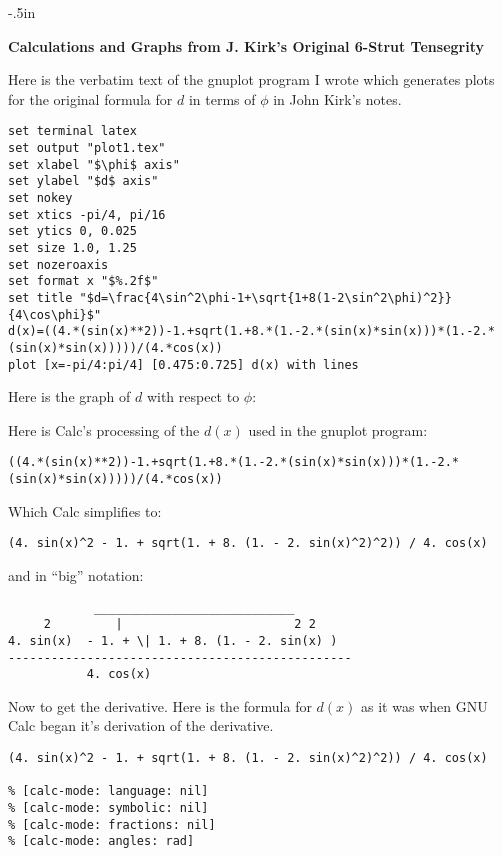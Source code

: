 \topmargin -.5in
\evensidemargin -0.5in
\oddsidemargin -0.5in
\headheight 0in\headsep 0in
\setlength{\textwidth}{7.25in}
\setlength{\textheight}{9.5in}

\begin{center} \Large\bf
  Calculations and Graphs from J. Kirk's Original 6-Strut Tensegrity
\end{center}

Here is the verbatim text of the gnuplot program I wrote which generates
plots for the original formula for $d$ in terms of $\phi$ in John Kirk's
notes.

\begin{verbatim}
set terminal latex
set output "plot1.tex"
set xlabel "$\phi$ axis"
set ylabel "$d$ axis"
set nokey
set xtics -pi/4, pi/16
set ytics 0, 0.025
set size 1.0, 1.25
set nozeroaxis
set format x "$%.2f$"
set title "$d=\frac{4\sin^2\phi-1+\sqrt{1+8(1-2\sin^2\phi)^2}}{4\cos\phi}$"
d(x)=((4.*(sin(x)**2))-1.+sqrt(1.+8.*(1.-2.*(sin(x)*sin(x)))*(1.-2.*(sin(x)*sin(x)))))/(4.*cos(x))
plot [x=-pi/4:pi/4] [0.475:0.725] d(x) with lines
\end{verbatim}
Here is the graph of $d$ with respect to $\phi$:
	\begin{center}
		
	\end{center}

Here is Calc's processing of the $d(x)$ used in the gnuplot program:
\begin{verbatim}
((4.*(sin(x)**2))-1.+sqrt(1.+8.*(1.-2.*(sin(x)*sin(x)))*(1.-2.*(sin(x)*sin(x)))))/(4.*cos(x))
\end{verbatim}

Which Calc simplifies to:
\begin{verbatim}
(4. sin(x)^2 - 1. + sqrt(1. + 8. (1. - 2. sin(x)^2)^2)) / 4. cos(x)
\end{verbatim}

\newpage

and in ``big'' notation:
\begin{verbatim}
		    ____________________________
	 2         |                        2 2
4. sin(x)  - 1. + \| 1. + 8. (1. - 2. sin(x) )
------------------------------------------------
		   4. cos(x)
\end{verbatim}

Now to get the derivative.  Here is the formula for $d(x)$ as it was
when GNU Calc began it's derivation of the derivative.
\begin{verbatim}
(4. sin(x)^2 - 1. + sqrt(1. + 8. (1. - 2. sin(x)^2)^2)) / 4. cos(x)

% [calc-mode: language: nil]
% [calc-mode: symbolic: nil]
% [calc-mode: fractions: nil]
% [calc-mode: angles: rad]
\end{verbatim}


